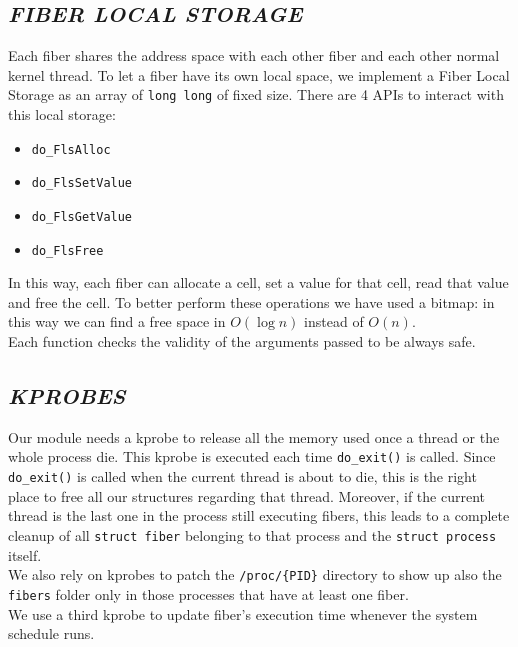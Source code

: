 \documentclass[a4paper]{article}
\begin{document}
\subsection*{\textit{FIBER LOCAL STORAGE}}
Each fiber shares the address space with each other fiber and each other normal kernel thread. To let a fiber have its own local space, we implement a Fiber Local Storage as an array of \texttt{long long} of fixed size. There are 4 APIs to interact with this local storage:

\begin{itemize}
  \item \texttt{do\_FlsAlloc}
  \item \texttt{do\_FlsSetValue}
  \item \texttt{do\_FlsGetValue}
  \item \texttt{do\_FlsFree}
\end{itemize}\bigskip
In this way, each fiber can allocate a cell, set a value for that cell, read that value and free the cell.
To better perform these operations we have used a bitmap: in this way we can find a free space in $O(\log n)$ instead of $O(n)$.\bigskip\\
Each function checks the validity of the arguments passed to be always safe.

\subsection*{\textit{KPROBES}}
Our module needs a kprobe to release all the memory used once a thread or the whole process die. This kprobe is executed each time \texttt{do\_exit()} is called. Since \texttt{do\_exit()} is called when the current thread is about to die, this is the right place to free all our structures regarding that thread. Moreover, if the current thread is the last one in the process still executing fibers, this leads to a complete cleanup of all \texttt{struct fiber} belonging to that process and the \texttt{struct process} itself.\bigskip\\
We also rely on kprobes to patch the \texttt{/proc/\{PID\}} directory to show up also the \texttt{fibers} folder only in those processes that have at least one fiber.\bigskip\\
We use a third kprobe to update fiber's execution time whenever the system schedule runs.
\end{document}
